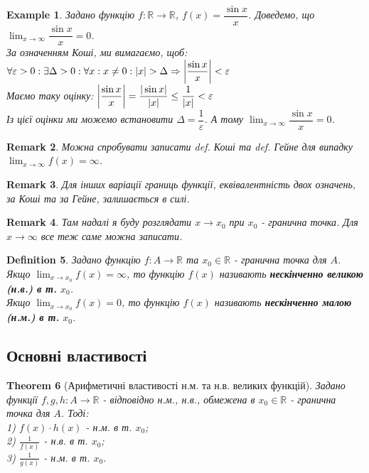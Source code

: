 \documentclass[a4paper, 14pt]{article}
\def\huge{\displaystyle}
\theoremstyle{theoremdd}
\newtheorem{theorem}{Theorem}[subsection]
\theoremstyle{theoremdd}
\newtheorem{definition}[theorem]{Definition}
\theoremstyle{theoremdd}
\theoremstyle{theoremdd}
\newtheorem{example}[theorem]{Example}
\theoremstyle{theoremdd}
\theoremstyle{theoremdd}
\newtheorem{remark}[theorem]{Remark}
\theoremstyle{theoremdd}
\theoremstyle{theoremdd}
\begin{document}
	\begin{example}
	Задано функцію $f: \mathbb{R} \to \mathbb{R}$, $f(x) = \dfrac{\sin x}{x}$. Доведемо, що $\huge\lim_{x \to \infty} \dfrac{\sin x}{x} = 0$.\\
	За означенням Коші, ми вимагаємо, щоб:\\
	$\forall \varepsilon > 0: \exists \Delta > 0: \forall x: x \neq 0: |x| > \Delta \Rightarrow \abs{\dfrac{\sin x}{x}} < \varepsilon$\\
	Маємо таку оцінку: $\abs{\dfrac{\sin x}{x}} = \dfrac{|\sin x|}{|x|} \leq \dfrac{1}{|x|} < \varepsilon$\\
	Із цієї оцінки ми можемо встановити $\Delta = \dfrac{1}{\varepsilon}$. А тому $\huge\lim_{x \to \infty} \dfrac{\sin x}{x} = 0$.
	\end{example}
	
	\begin{remark}
	Можна спробувати записати def. Коші та def. Гейне для випадку $\huge \lim_{x \to \infty} f(x) = \infty$.
	\end{remark}
	
	\begin{remark}
	Для інших варіації границь функції, еквівалентність двох означень, за Коші та за Гейне, залишається в силі.
	\end{remark}
	
	\begin{remark}
	Там надалі я буду розглядати $x \to x_0$ при $x_0$ - гранична точка. Для $x \to \infty$ все теж саме можна записати.
	\end{remark}
	
	\begin{definition}
	Задано функцію $f: A \to \mathbb{R}$ та $x_0 \in \mathbb{R}$ - гранична точка для $A$.\\
	Якщо $\huge \lim_{x \to x_0} f(x) = \infty$, то функцію $f(x)$ називають \textbf{нескінченно великою (н.в.) в т.} $x_0$.\\
	Якщо $\huge \lim_{x \to x_0} f(x) = 0$, то функцію $f(x)$ називають \textbf{нескінченно малою (н.м.) в т.} $x_0$.\\
	\end{definition}
	
	\subsection{Основні властивості}
	\begin{theorem}[Арифметичні властивості н.м. та н.в. великих функцій]
	Задано функції $f,g,h: A \to \mathbb{R}$ - відповідно н.м., н.в., обмежена в $x_0 \in \mathbb{R}$ - гранична точка для $A$. Тоді:\\
	1) $f(x) \cdot h(x)$ - н.м. в т. $x_0$;\\
	2) $\huge \frac{1}{f(x)}$ - н.в. в т. $x_0$;\\
	3) $\huge \frac{1}{g(x)}$ - н.м. в т. $x_0$.
	\end{theorem}
	
\end{document}
